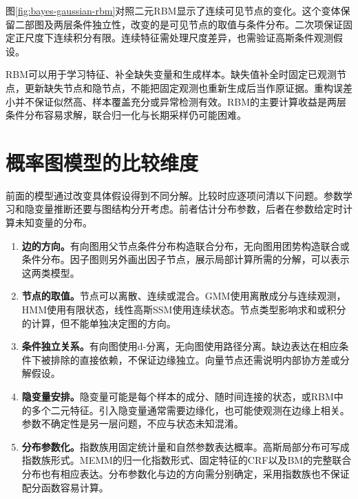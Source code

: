 图\ref{fig:bayes-gaussian-rbm}对照二元RBM显示了连续可见节点的变化。这个变体保留二部图及两层条件独立性，改变的是可见节点的取值与条件分布。二次项保证固定正尺度下连续积分有限。连续特征需处理尺度差异，也需验证高斯条件观测假设。

RBM可以用于学习特征、补全缺失变量和生成样本。缺失值补全时固定已观测节点，更新缺失节点和隐节点，不能把固定观测也重新生成后当作原证据。重构误差小并不保证似然高、样本覆盖充分或异常检测有效。RBM的主要计算收益是两层条件分布容易求解，联合归一化与长期采样仍可能困难。

\section{概率图模型的比较维度}
前面的模型通过改变具体假设得到不同分解。比较时应逐项问清以下问题。参数学习和隐变量推断还要与图结构分开考虑。前者估计分布参数，后者在参数给定时计算未知变量的分布。
\begin{enumerate}
 \item \textbf{边的方向。}有向图用父节点条件分布构造联合分布，无向图用团势构造联合或条件分布。因子图则另外画出因子节点，展示局部计算所需的分解，可以表示这两类模型。
 \item \textbf{节点的取值。}节点可以离散、连续或混合。GMM使用离散成分与连续观测，HMM使用有限状态，线性高斯SSM使用连续状态。节点类型影响求和或积分的计算，但不能单独决定图的方向。
 \item \textbf{条件独立关系。}有向图使用d-分离，无向图使用路径分离。缺边表达在相应条件下被排除的直接依赖，不保证边缘独立。向量节点还需说明内部协方差或分解假设。
 \item \textbf{隐变量安排。}隐变量可能是每个样本的成分、随时间连接的状态，或RBM中的多个二元特征。引入隐变量通常需要边缘化，也可能使观测在边缘上相关。参数不确定性是另一层问题，不应与状态未知混淆。
 \item \textbf{分布参数化。}指数族用固定统计量和自然参数表达概率。高斯局部分布可写成指数族形式。MEMM的归一化指数形式、固定特征的CRF以及BM的完整联合分布也有相应表达。分布参数化与边的方向需分别确定，采用指数族也不保证配分函数容易计算。
\end{enumerate}

